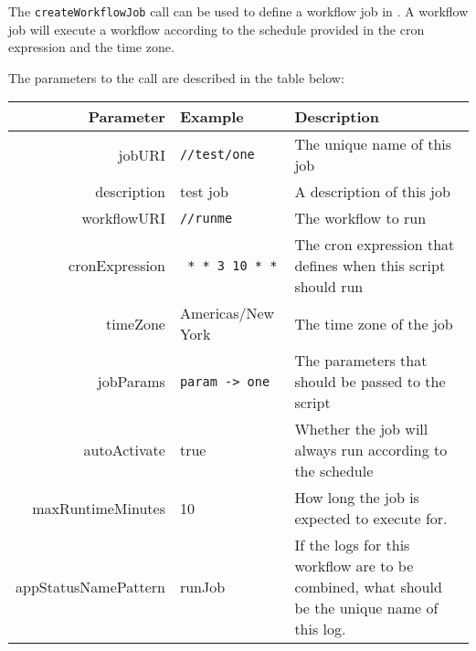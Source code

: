 The \verb+createWorkflowJob+ call can be used to define a workflow job in \Rapture. A workflow job will execute
a workflow according to the schedule provided in the cron expression and the time zone.

The parameters to the call are described in the table below:

\begin{table}[H]
\begin{center}
\begin{tabular}{r l p{4cm}}
  Parameter & Example & Description \\
  \hline
  jobURI &  \verb+//test/one+ & The unique name of this job \\
  description  & test job & A description of this job \\
  workflowURI  & \verb+//runme+ & The workflow to run \\
  cronExpression  & \verb+ * * 3 10 * *+ & The cron expression that defines when this script should run \\
  timeZone &  Americas/New York & The time zone of the job \\
  jobParams &  \verb+param -> one+ & The parameters that should be passed to the script \\
  autoActivate &  true & Whether the job will always run according to the schedule \\
  maxRuntimeMinutes &  10 & How long the job is expected to execute for. \\
  appStatusNamePattern & runJob & If the logs for this workflow are to be combined, what should be the unique name of this log.\\
\end{tabular}
\end{center}
\end{table}
